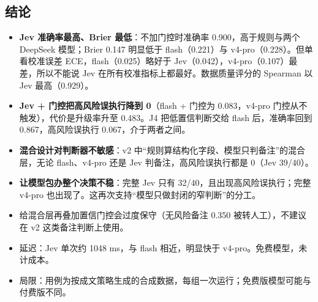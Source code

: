 \documentclass[
  10pt,
]{ctexart}
\providecommand{\tightlist}{%
  \setlength{\itemsep}{0pt}\setlength{\parskip}{0pt}}
\begin{document}
\subsection{结论}\label{ux7ed3ux8bba}

\begin{itemize}
\tightlist
\item
  \textbf{Jev 准确率最高、Brier 最低}：不加门控时准确率
  0.900，高于规则与两个 DeepSeek 模型；Brier 0.147 明显低于
  flash（0.221）与 v4-pro（0.228）。但单看校准误差
  ECE，flash（0.025）略好于
  Jev（0.042），v4-pro（0.107）最差，所以不能说 Jev
  在所有校准指标上都最好。数据质量评分的 Spearman 以 Jev 最高（0.929）。
\item
  \textbf{Jev + 门控把高风险误执行降到 0}（flash + 门控为 0.083，v4-pro
  门控从不触发），代价是升级率升至 0.483。J4 把低置信判断交给 flash
  后，准确率回到 0.867，高风险误执行 0.067，介于两者之间。
\item
  \textbf{混合设计对判断器不敏感}：v2
  中``规则算结构化字段、模型只判备注''的混合层，无论 flash、v4-pro 还是
  Jev 判备注，高风险误执行都是 0（Jev 39/40）。
\item
  \textbf{让模型包办整个决策不稳}：完整 Jev 只有
  32/40，且出现高风险误执行；完整 v4-pro
  也出现了。这再次支持``模型只做封闭的窄判断''的分工。
\item
  给混合层再叠加置信门控会过度保守（无风险备注 0.350
  被转人工），不建议在 v2 这类备注判断上使用。
\item
  延迟：Jev 单次约 1048 ms，与 flash 相近，明显快于
  v4-pro。免费模型，未计成本。
\item
  局限：用例为按成文策略生成的合成数据，每组一次运行；免费版模型可能与付费版不同。
\end{itemize}
\end{document}
